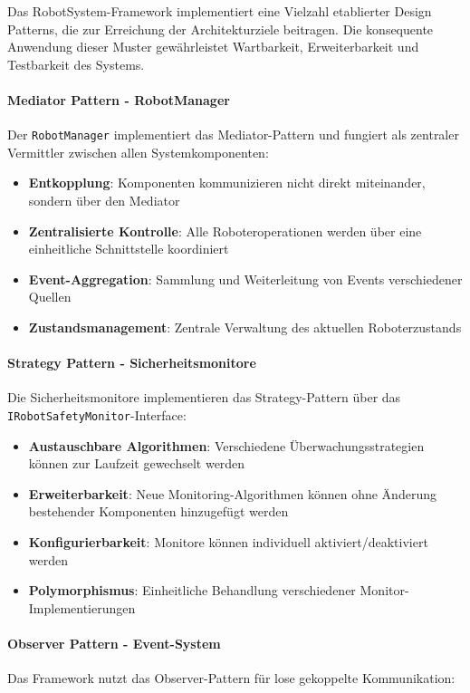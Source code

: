 Das RobotSystem-Framework implementiert eine Vielzahl etablierter Design
Patterns, die zur Erreichung der Architekturziele beitragen. Die konsequente
Anwendung dieser Muster gewährleistet Wartbarkeit, Erweiterbarkeit und
Testbarkeit des Systems.

\paragraph{Mediator Pattern - RobotManager}
Der \texttt{RobotManager} implementiert das Mediator-Pattern
\cite{gamma1995design} und fungiert als zentraler Vermittler zwischen allen
Systemkomponenten:

\begin{itemize}
    \item \textbf{Entkopplung}: Komponenten kommunizieren nicht direkt miteinander, sondern über den Mediator
    \item \textbf{Zentralisierte Kontrolle}: Alle Roboteroperationen werden über eine einheitliche Schnittstelle koordiniert
    \item \textbf{Event-Aggregation}: Sammlung und Weiterleitung von Events verschiedener Quellen
    \item \textbf{Zustandsmanagement}: Zentrale Verwaltung des aktuellen Roboterzustands
\end{itemize}

\paragraph{Strategy Pattern - Sicherheitsmonitore}
Die Sicherheitsmonitore implementieren das Strategy-Pattern über das
\texttt{IRobotSafetyMonitor}-Interface:

\begin{itemize}
    \item \textbf{Austauschbare Algorithmen}: Verschiedene Überwachungsstrategien können zur Laufzeit gewechselt werden
    \item \textbf{Erweiterbarkeit}: Neue Monitoring-Algorithmen können ohne Änderung bestehender Komponenten hinzugefügt werden
    \item \textbf{Konfigurierbarkeit}: Monitore können individuell aktiviert/deaktiviert werden
    \item \textbf{Polymorphismus}: Einheitliche Behandlung verschiedener Monitor-Implementierungen
\end{itemize}

\paragraph{Observer Pattern - Event-System}
Das Framework nutzt das Observer-Pattern für lose gekoppelte Kommunikation:

